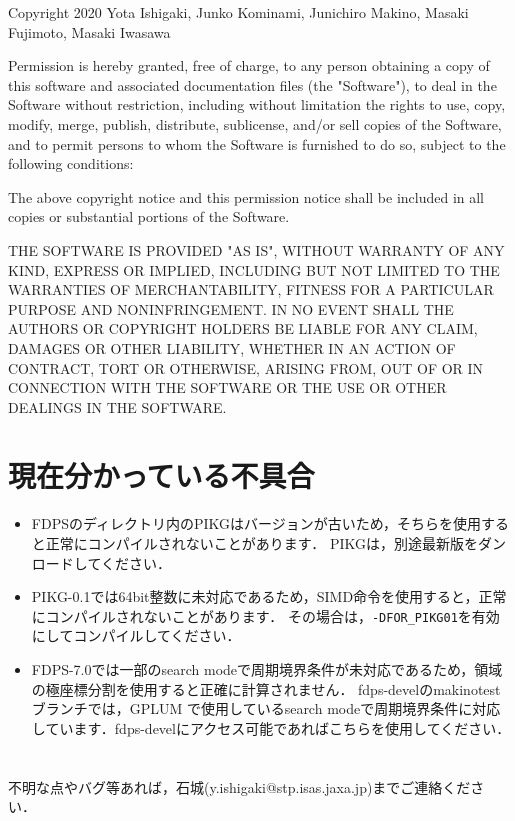 \documentclass[12pt,a4paper,dvipdfmx]{jsarticle}
\newcommand{\ourcode}{GPLUM\xspace}
\begin{document}
Copyright 2020 Yota Ishigaki, Junko Kominami, Junichiro Makino, Masaki Fujimoto, Masaki Iwasawa

Permission is hereby granted, free of charge, to any person obtaining a copy of this software and associated documentation files (the "Software"), to deal in the Software without restriction, including without limitation the rights to use, copy, modify, merge, publish, distribute, sublicense, and/or sell copies of the Software, and to permit persons to whom the Software is furnished to do so, subject to the following conditions:

The above copyright notice and this permission notice shall be included in all copies or substantial portions of the Software.

THE SOFTWARE IS PROVIDED "AS IS", WITHOUT WARRANTY OF ANY KIND, EXPRESS OR IMPLIED, INCLUDING BUT NOT LIMITED TO THE WARRANTIES OF MERCHANTABILITY, FITNESS FOR A PARTICULAR PURPOSE AND NONINFRINGEMENT. IN NO EVENT SHALL THE AUTHORS OR COPYRIGHT HOLDERS BE LIABLE FOR ANY CLAIM, DAMAGES OR OTHER LIABILITY, WHETHER IN AN ACTION OF CONTRACT, TORT OR OTHERWISE, ARISING FROM, OUT OF OR IN CONNECTION WITH THE SOFTWARE OR THE USE OR OTHER DEALINGS IN THE SOFTWARE.


\section{現在分かっている不具合\label{s:error}}

\begin{itemize}
\item
FDPSのディレクトリ内のPIKGはバージョンが古いため，そちらを使用すると正常にコンパイルされないことがあります．
PIKGは，別途最新版をダンロードしてください．

\item
PIKG-0.1では64bit整数に未対応であるため，SIMD命令を使用すると，正常にコンパイルされないことがあります．
その場合は，\texttt{-DFOR\_PIKG01}を有効にしてコンパイルしてください．

\item
FDPS-7.0では一部のsearch modeで周期境界条件が未対応であるため，領域の極座標分割を使用すると正確に計算されません．
fdps-develのmakinotestブランチでは，\ourcode で使用しているsearch modeで周期境界条件に対応しています．fdps-develにアクセス可能であればこちらを使用してください．

\end{itemize}



\section*{}

不明な点やバグ等あれば，石城(y.ishigaki@stp.isas.jaxa.jp)までご連絡ください．
\end{document}
